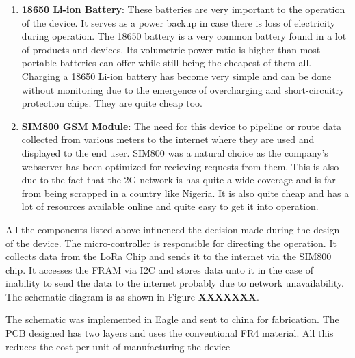 \begin{enumerate}
\item \textbf{18650 Li-ion Battery}: These batteries are very important to the operation of the device. It serves as a power backup in case there is loss of electricity during operation. The 18650 battery is a very common battery found in a lot of products and devices. Its volumetric power ratio is higher than most portable batteries can offer while still being the cheapest of them all. Charging a 18650 Li-ion battery has become very simple and can be done without monitoring due to the emergence of overcharging and short-circuitry protection chips.  They are quite cheap too. 

\item \textbf{SIM800 GSM Module}: The need for this device to pipeline or route data collected from various meters to the internet where they are used and displayed to the end user. SIM800 was a natural choice as the company's webserver has been optimized for recieving requests from them. This is also due to the fact that the 2G network is has quite a wide coverage and is far from being scrapped in a country like Nigeria. It is also quite cheap and has a lot of resources available online and quite easy to get it into operation. 
\end{enumerate}

All the components listed above influenced the decision made during the design of the device. The micro-controller is responsible for directing the operation. It collects data from the LoRa Chip and sends it to the internet via the SIM800 chip. It accesses the FRAM via I2C and stores data unto it in the case of inability to send the data to the internet probably due to network unavailability. The schematic diagram is as shown in Figure \textbf{XXXXXXX}. 

The schematic was implemented in Eagle and sent to china for fabrication. The PCB designed has two layers and uses the conventional FR4 material. All this reduces the cost per unit of manufacturing the device

